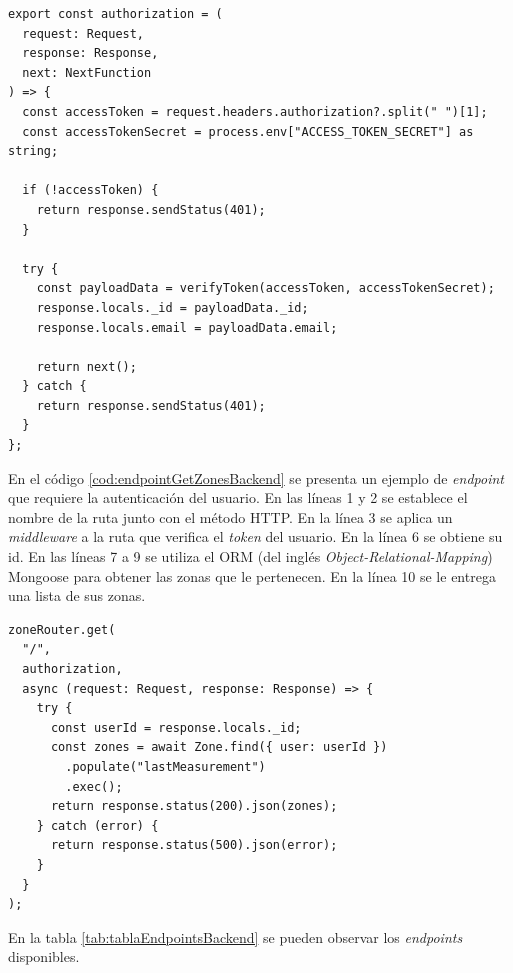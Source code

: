 \begin{lstlisting}[label=cod:autenticaciónBackend,caption=Autenticación de usuarios mediante un \emph{middleware}.]
export const authorization = (
  request: Request,
  response: Response,
  next: NextFunction
) => {
  const accessToken = request.headers.authorization?.split(" ")[1];
  const accessTokenSecret = process.env["ACCESS_TOKEN_SECRET"] as string;

  if (!accessToken) {
    return response.sendStatus(401);
  }

  try {
    const payloadData = verifyToken(accessToken, accessTokenSecret);
    response.locals._id = payloadData._id;
    response.locals.email = payloadData.email;

    return next();
  } catch {
    return response.sendStatus(401);
  }
};
\end{lstlisting}

En el código \ref{cod:endpointGetZonesBackend} se presenta un ejemplo de \emph{endpoint} que requiere la autenticación del usuario. En las líneas 1 y 2 se establece el nombre de la ruta junto con el método HTTP. En la línea 3 se aplica un \emph{middleware} a la ruta que verifica el \emph{token} del usuario. En la línea 6 se obtiene su id. En las líneas 7 a 9 se utiliza el ORM (del inglés \textit{Object-Relational-Mapping}) Mongoose para obtener las zonas que le pertenecen. En la línea 10 se le entrega una lista de sus zonas.

\begin{lstlisting}[label=cod:endpointGetZonesBackend,caption=\emph{Endpoint} que requiere autenticación.]
zoneRouter.get(
  "/",
  authorization,
  async (request: Request, response: Response) => {
    try {
      const userId = response.locals._id;
      const zones = await Zone.find({ user: userId })
        .populate("lastMeasurement")
        .exec();
      return response.status(200).json(zones);
    } catch (error) {
      return response.status(500).json(error);
    }
  }
);
\end{lstlisting} 

En la tabla \ref{tab:tablaEndpointsBackend} se pueden observar los \textit{endpoints} disponibles.

